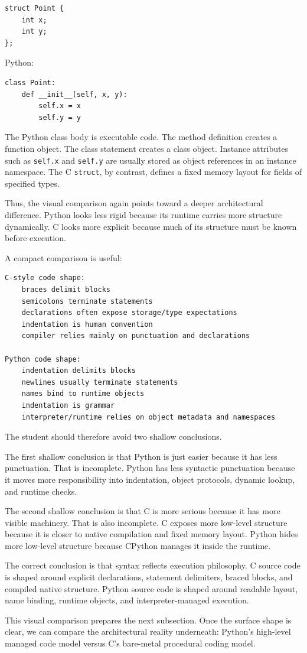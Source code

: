 \begin{verbatim}
struct Point {
    int x;
    int y;
};
\end{verbatim}

Python:

\begin{verbatim}
class Point:
    def __init__(self, x, y):
        self.x = x
        self.y = y
\end{verbatim}

The Python class body is executable code. The method definition creates a function object. The class statement creates a class object. Instance attributes such as \texttt{self.x} and \texttt{self.y} are usually stored as object references in an instance namespace. The C \texttt{struct}, by contrast, defines a fixed memory layout for fields of specified types.

Thus, the visual comparison again points toward a deeper architectural difference. Python looks less rigid because its runtime carries more structure dynamically. C looks more explicit because much of its structure must be known before execution.

A compact comparison is useful:

\begin{verbatim}
C-style code shape:
    braces delimit blocks
    semicolons terminate statements
    declarations often expose storage/type expectations
    indentation is human convention
    compiler relies mainly on punctuation and declarations

Python code shape:
    indentation delimits blocks
    newlines usually terminate statements
    names bind to runtime objects
    indentation is grammar
    interpreter/runtime relies on object metadata and namespaces
\end{verbatim}

The student should therefore avoid two shallow conclusions.

The first shallow conclusion is that Python is just easier because it has less punctuation. That is incomplete. Python has less syntactic punctuation because it moves more responsibility into indentation, object protocols, dynamic lookup, and runtime checks.

The second shallow conclusion is that C is more serious because it has more visible machinery. That is also incomplete. C exposes more low-level structure because it is closer to native compilation and fixed memory layout. Python hides more low-level structure because CPython manages it inside the runtime.

The correct conclusion is that syntax reflects execution philosophy. C source code is shaped around explicit declarations, statement delimiters, braced blocks, and compiled native structure. Python source code is shaped around readable layout, name binding, runtime objects, and interpreter-managed execution.

This visual comparison prepares the next subsection. Once the surface shape is clear, we can compare the architectural reality underneath: Python's high-level managed code model versus C's bare-metal procedural coding model.